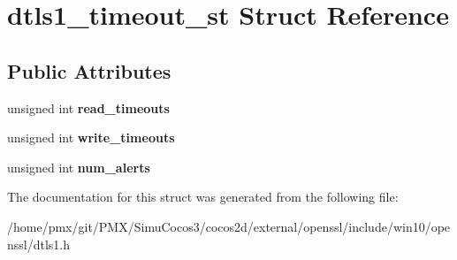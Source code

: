 \hypertarget{structdtls1__timeout__st}{}\section{dtls1\+\_\+timeout\+\_\+st Struct Reference}
\label{structdtls1__timeout__st}
\subsection*{Public Attributes}
\begin{DoxyCompactItemize}
\item 
\mbox{\label{structdtls1__timeout__st_a6ea960c7ff443be84029bb3252c6e144}} 
unsigned int {\bfseries read\+\_\+timeouts}
\item 
\mbox{\label{structdtls1__timeout__st_af3fb942d16bbbdf73e6151d7e4e6113b}} 
unsigned int {\bfseries write\+\_\+timeouts}
\item 
\mbox{\label{structdtls1__timeout__st_ab525be86e71d151a15e58e877d1dcd4e}} 
unsigned int {\bfseries num\+\_\+alerts}
\end{DoxyCompactItemize}


The documentation for this struct was generated from the following file\+:\begin{DoxyCompactItemize}
\item 
/home/pmx/git/\+P\+M\+X/\+Simu\+Cocos3/cocos2d/external/openssl/include/win10/openssl/dtls1.\+h\end{DoxyCompactItemize}
